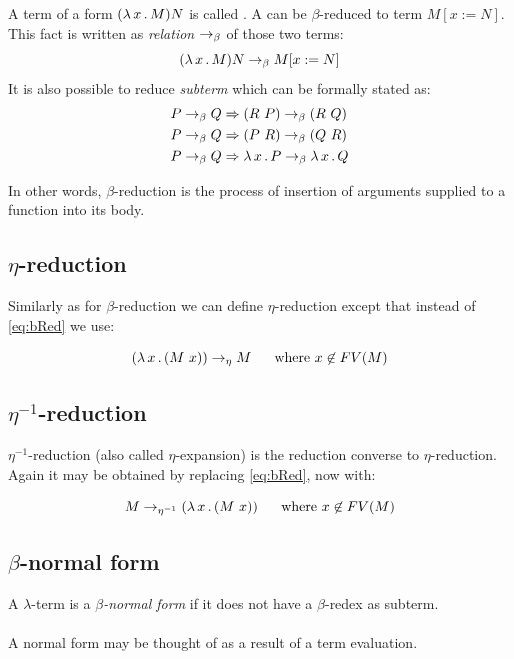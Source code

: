 \documentclass[12pt,a4paper]{report}
\newcommand{\lterm}{$\lambda$-term\xspace}
\begin{document}
A term of a form $( \lambda \, x \, . \, M )N$ is called \textit{\bRedex}.
A \bRedex can be $\beta$-reduced to term $M[x:=N]$. 
This fact is written as \textit{relation} $\rightarrow_\beta$ 
of those two terms:
\begin{equation} \label{eq:bRed}
( \lambda \, x \, . \, M )N \rightarrow_\beta M[x:=N]
\end{equation}
It is also possible to reduce \textit{subterm \bRedexes} 
which can be formally stated as:
\begin{align*}
P \rightarrow_\beta Q &\Rightarrow (R~P)      \rightarrow_\beta (R~Q) \\
P \rightarrow_\beta Q &\Rightarrow (P~R)      \rightarrow_\beta (Q~R) \\
P \rightarrow_\beta Q &\Rightarrow \lambda \, x \, . \, P \rightarrow_\beta \lambda \, x \, . \, Q  
\end{align*}

In other words, $\beta$-reduction is the process 
of insertion of arguments supplied to a function into 
its body. 

\subsection{$\eta$-reduction}

Similarly as for $\beta$-reduction we can define $\eta$-reduction 
except that instead of \ref{eq:bRed} we use:  

$$( \lambda \, x \, . \, (M~x) ) \rightarrow_\eta M \text{ ~~~~where } x \not\in FV(M) $$

\subsection{$\eta^{-1}$-reduction}

$\eta^{-1}$-reduction (also called $\eta$-expansion) is 
the reduction converse to $\eta$-reduction.
Again it may be obtained by replacing \ref{eq:bRed}, now with:  

$$M \rightarrow_{\eta^{-1}} ( \lambda \, x \, . \, (M~x) ) \text{ ~~~~where } x \not\in FV(M) $$




\subsection{$\beta$-normal form}

A \lterm is a \textit{$\beta$-normal form} if it does not have a $\beta$-redex as
subterm.
\\\\
A normal form may be thought of as a result of a term evaluation. 
\end{document}
